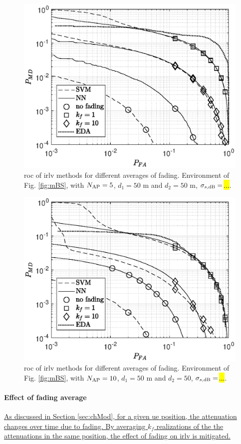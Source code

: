 \documentclass[draftcls,onecolumn,12pt]{IEEEtran}
\begin{document}
{%

\begin{figure}[t]
    \centering
    \includegraphics[width=0.6\columnwidth]{res_fading_5BS_2Class.eps}
    \caption{\ac{roc} of \ac{irlv} methods for different averages of fading. Environment of Fig. \ref{fig:mBS}, with  $N_{\rm AP}=5$, $d_1 = 50 $ m and $d_2 = 50$ m, $\sigma_{s,{\rm dB}} = $\hl{...}.}
    \label{fig:kf10-5}
\end{figure}


\begin{figure}[t]
    \centering
    \includegraphics[width=0.6\columnwidth]{res_fading_10BS_2Class.eps}
    \caption{\ac{roc} of \ac{irlv} methods for different averages of fading. Environment of Fig. \ref{fig:mBS}, with  $N_{\rm AP}=10$, $d_1 = 50$ m and $d_2 = 50$, $\sigma_{s,{\rm dB}} = $\hl{...}.}
    \label{fig:kf10}
\end{figure}


\paragraph{Effect of fading average}  \uline{As discussed in Section \ref{sec:chMod}, for a given \ac{ue} position, the attenuation changes over time due to fading. By averaging  $k_f$ realizations of the the attenuations in the same position, the effect of fading on \ac{irlv} is mitigated. }  

}
\end{document}
